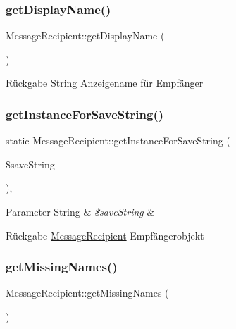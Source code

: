 \subsubsection{\texorpdfstring{get\+Display\+Name()}{getDisplayName()}}
{\footnotesize\ttfamily Message\+Recipient\+::get\+Display\+Name (\begin{DoxyParamCaption}{ }\end{DoxyParamCaption})\hspace{0.3cm}{\ttfamily [abstract]}}

\begin{DoxyReturn}{Rückgabe}
String Anzeigename für Empfänger 
\end{DoxyReturn}
\mbox{\label{class_message_recipient_a60a3f2e316b8469fd5a0a85f1090bce1}} 
\subsubsection{\texorpdfstring{get\+Instance\+For\+Save\+String()}{getInstanceForSaveString()}}
{\footnotesize\ttfamily static Message\+Recipient\+::get\+Instance\+For\+Save\+String (\begin{DoxyParamCaption}\item[{}]{\$save\+String }\end{DoxyParamCaption})\hspace{0.3cm}{\ttfamily [static]}, {\ttfamily [abstract]}}


\begin{DoxyParams}[1]{Parameter}
String & {\em \$save\+String} & \\
\hline
\end{DoxyParams}
\begin{DoxyReturn}{Rückgabe}
\mbox{\hyperlink{class_message_recipient}{Message\+Recipient}} Empfängerobjekt 
\end{DoxyReturn}
\mbox{\label{class_message_recipient_a6222eaf2087b16cd705a811998bea076}} 
\subsubsection{\texorpdfstring{get\+Missing\+Names()}{getMissingNames()}}
{\footnotesize\ttfamily Message\+Recipient\+::get\+Missing\+Names (\begin{DoxyParamCaption}{ }\end{DoxyParamCaption})\hspace{0.3cm}{\ttfamily [abstract]}}

